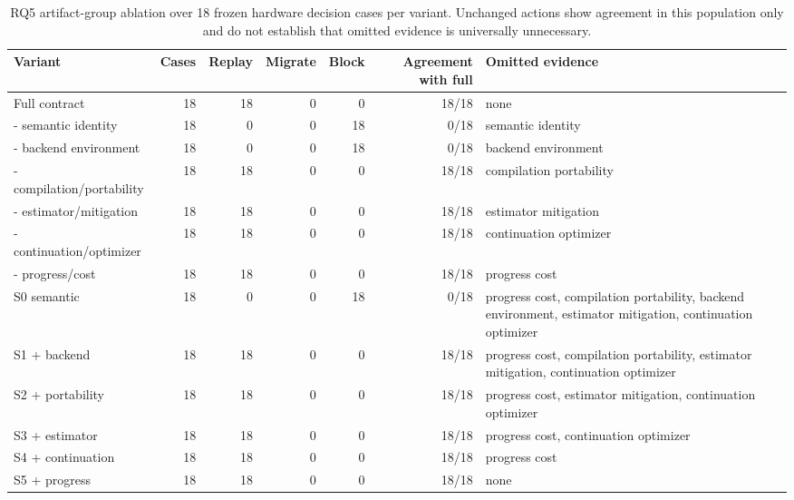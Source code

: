 \begin{table}[t]
\centering
\small
\caption{RQ5 artifact-group ablation over 18 frozen hardware decision cases per variant. Unchanged actions show agreement in this population only and do not establish that omitted evidence is universally unnecessary.}
\label{tab:hardware-rq5-ablation}
\begin{tabular}{@{}lrrrrrp{}@{}}
\toprule
\textbf{Variant} & \textbf{Cases} & \textbf{Replay} & \textbf{Migrate} & \textbf{Block} & \textbf{Agreement with full} & \textbf{Omitted evidence} \\
\midrule
Full contract & 18 & 18 & 0 & 0 & 18/18 & none \\
- semantic identity & 18 & 0 & 0 & 18 & 0/18 & semantic identity \\
- backend environment & 18 & 0 & 0 & 18 & 0/18 & backend environment \\
- compilation/portability & 18 & 18 & 0 & 0 & 18/18 & compilation portability \\
- estimator/mitigation & 18 & 18 & 0 & 0 & 18/18 & estimator mitigation \\
- continuation/optimizer & 18 & 18 & 0 & 0 & 18/18 & continuation optimizer \\
- progress/cost & 18 & 18 & 0 & 0 & 18/18 & progress cost \\
S0 semantic & 18 & 0 & 0 & 18 & 0/18 & progress cost, compilation portability, backend environment, estimator mitigation, continuation optimizer \\
S1 + backend & 18 & 18 & 0 & 0 & 18/18 & progress cost, compilation portability, estimator mitigation, continuation optimizer \\
S2 + portability & 18 & 18 & 0 & 0 & 18/18 & progress cost, estimator mitigation, continuation optimizer \\
S3 + estimator & 18 & 18 & 0 & 0 & 18/18 & progress cost, continuation optimizer \\
S4 + continuation & 18 & 18 & 0 & 0 & 18/18 & progress cost \\
S5 + progress & 18 & 18 & 0 & 0 & 18/18 & none \\
\bottomrule
\end{tabular}
\end{table}
